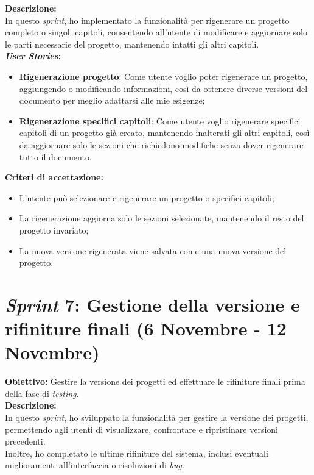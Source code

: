 \noindent \textbf{Descrizione:}\\
\noindent In questo \textit{sprint}, ho implementato la funzionalità per rigenerare un progetto completo o singoli capitoli, consentendo all'utente di modificare e aggiornare solo le parti necessarie del progetto, mantenendo intatti gli altri capitoli.\\

\noindent \textbf{\textit{User Stories}:} 
\begin{itemize}
    \item \textbf{Rigenerazione progetto}: Come utente voglio poter rigenerare un progetto, aggiungendo o modificando informazioni, così da ottenere diverse versioni del documento per meglio adattarsi alle mie esigenze;
    \item \textbf{Rigenerazione specifici capitoli}: Come utente voglio rigenerare specifici capitoli di un progetto già creato, mantenendo inalterati gli altri capitoli, così da aggiornare solo le sezioni che richiedono modifiche senza dover rigenerare tutto il documento.
\end{itemize}

\noindent \textbf{Criteri di accettazione:}  
\begin{itemize}
    \item L'utente può selezionare e rigenerare un progetto o specifici capitoli;
    \item La rigenerazione aggiorna solo le sezioni selezionate, mantenendo il resto del progetto invariato;
    \item La nuova versione rigenerata viene salvata come una nuova versione del progetto.
\end{itemize}

\section*{\textit{Sprint} 7: Gestione della versione e rifiniture finali (6 Novembre - 12 Novembre)}
\textbf{Obiettivo:} Gestire la versione dei progetti ed effettuare le rifiniture finali prima della fase di \textit{testing}.\\

\noindent \textbf{Descrizione:}\\
\noindent In questo \textit{sprint}, ho sviluppato la funzionalità per gestire la versione dei progetti, permettendo agli utenti di visualizzare, confrontare e ripristinare versioni precedenti.\\
Inoltre, ho completato le ultime rifiniture del sistema, inclusi eventuali miglioramenti all'interfaccia o risoluzioni di \textit{bug}.\\

